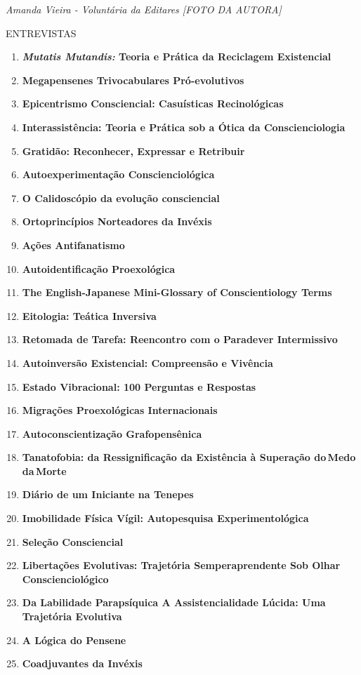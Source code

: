 \documentclass[
]{article}
\begin{document}
\emph{Amanda Vieira - Voluntária da Editares {[}FOTO DA AUTORA{]}}

ENTREVISTAS

\begin{enumerate}
\def\labelenumi{\arabic{enumi}.}
\item
  \textbf{\emph{Mutatis Mutandis:} Teoria e Prática da Reciclagem Existencial}
\item
  \textbf{Megapensenes Trivocabulares Pró-evolutivos}
\item
  \textbf{Epicentrismo Consciencial: Casuísticas Recinológicas}
\item
  \textbf{Interassistência: Teoria e Prática sob a Ótica da Conscienciologia}
\item
  \textbf{Gratidão: Reconhecer, Expressar e Retribuir}
\item
  \textbf{Autoexperimentação Conscienciológica}
\item
  \textbf{O Calidoscópio da evolução consciencial}
\item
  \textbf{Ortoprincípios Norteadores da Invéxis}
\item
  \textbf{Ações Antifanatismo}
\item
  \textbf{Autoidentificação Proexológica}
\item
  \textbf{The English-Japanese Mini-Glossary of Conscientiology Terms}
\item
  \textbf{Eitologia: Teática Inversiva}
\item
  \textbf{Retomada de Tarefa: Reencontro com o Paradever Intermissivo}
\item
  \textbf{Autoinversão Existencial: Compreensão e Vivência}
\item
  \textbf{Estado Vibracional: 100 Perguntas e Respostas}
\item
  \textbf{Migrações Proexológicas Internacionais}
\item
  \textbf{Autoconscientização Grafopensênica}
\item
  \textbf{Tanatofobia: da Ressignificação da Existência à Superação do\,Medo\,da\,Morte}
\item
  \textbf{Diário de um Iniciante na Tenepes}
\item
  \textbf{Imobilidade Física Vígil: Autopesquisa Experimentológica}
\item
  \textbf{Seleção Consciencial}
\item
  \textbf{Libertações Evolutivas: Trajetória Semperaprendente Sob Olhar Conscienciológico}
\item
  \textbf{Da Labilidade Parapsíquica A Assistencialidade Lúcida: Uma Trajetória Evolutiva}
\item
  \textbf{A Lógica do Pensene}
\item
  \textbf{Coadjuvantes da Invéxis}
\end{enumerate}
\end{document}
